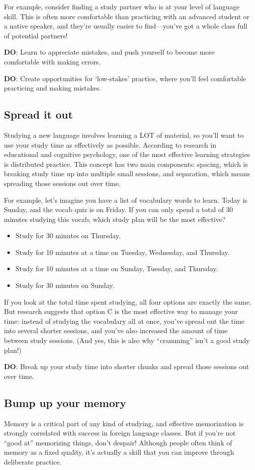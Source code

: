 \documentclass[../main.tex]{subfiles}
\begin{document}
For example, consider finding a study partner who is at your level of language
skill. This is often more comfortable than practicing with an advanced student
or a native speaker, and they're usually easier to find—you've got a whole class
full of potential partners!

\textbf{DO}: Learn to appreciate mistakes, and push yourself to become more comfortable
with making errors.

\textbf{DO}: Create opportunities for ‘low-stakes' practice, where you'll feel
comfortable practicing and making mistakes.
%
\subsection{Spread it out}
Studying a new language involves learning a LOT of material, so you'll want to
use your study time as effectively as possible. According to research in
educational and cognitive psychology, one of the most effective learning
strategies is distributed practice. This concept has two main components:
spacing, which is breaking study time up into multiple small sessions, and
separation, which means spreading those sessions out over time.

For example, let's imagine you have a list of vocabulary words to learn. Today
is Sunday, and the vocab quiz is on Friday. If you can only spend a total of 30
minutes studying this vocab, which study plan will be the most effective?
%
\begin{itemize}
  \item Study for 30 minutes on Thursday.
  \item Study for 10 minutes at a time on Tuesday, Wednesday, and Thursday.
  \item Study for 10 minutes at a time on Sunday, Tuesday, and Thursday.
  \item Study for 30 minutes on Sunday.
\end{itemize}
%
If you look at the total time spent studying, all four options are exactly the
same. But research suggests that option C is the most effective way to manage
your time: instead of studying the vocabulary all at once, you've spread out the
time into several shorter sessions, and you've also increased the amount of time
between study sessions. (And yes, this is also why ``cramming'' isn't a good study
plan!)

\textbf{DO}: Break up your study time into shorter chunks and spread those
sessions out over time.
%
\subsection{Bump up your memory}
Memory is a critical part of any kind of studying, and effective memorization is
strongly correlated with success in foreign language classes. But if you're
not ``good at'' memorizing things, don't despair! Although people often think of
memory as a fixed quality, it's actually a skill that you can improve through
deliberate practice.
\end{document}
